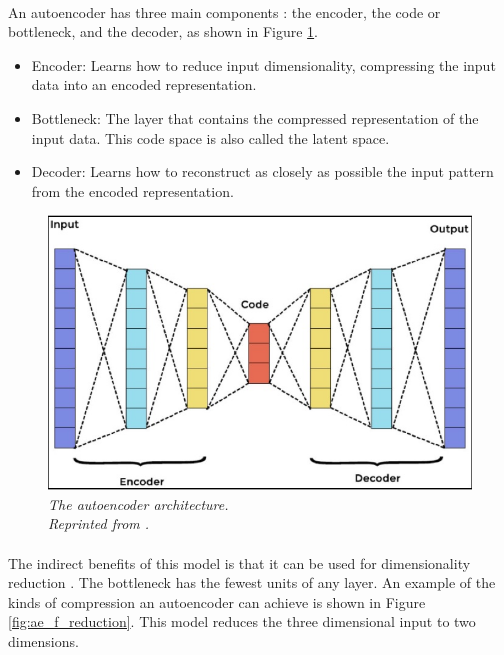 \paragraph{}
An autoencoder has three main components \cite{badr_2019}: the encoder, the code or bottleneck, and the decoder, as shown in Figure \ref{fig:ae_architecture}.
\begin{itemize}
\item Encoder: Learns how to reduce input dimensionality, compressing the input data into an encoded representation.
\item Bottleneck: The layer that contains the compressed representation of the input data. This code space is also called the latent space.
\item Decoder: Learns how to reconstruct as closely as possible the input pattern from the encoded representation.
\end{itemize}

\begin{figure}[H]
  \centering
  \caption[The autoencoder architecture.]{\emph{The autoencoder architecture. \\
  Reprinted from \citeauthor{pedamkar_2019} \citeyear{pedamkar_2019}.}}\label{fig:ae_architecture}
  \includegraphics[scale = 0.5]{figures/ae_architecture.jpg}  
\end{figure}

\paragraph{}
The indirect benefits of this model is that it can be used for dimensionality reduction \cite{rajan_2021}. The bottleneck has the fewest units of any layer. An example of the kinds of compression an autoencoder can achieve is shown in Figure \ref{fig:ae_f_reduction}. This model reduces the three dimensional input to two dimensions.


